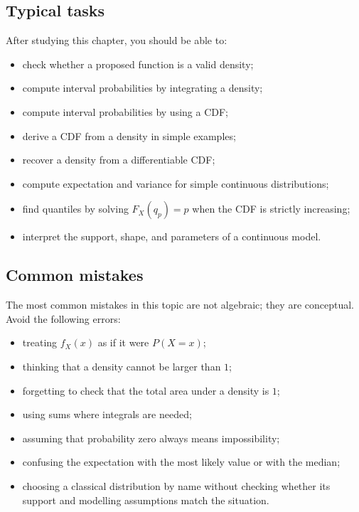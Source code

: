 \subsection*{Typical tasks}

After studying this chapter, you should be able to:
\begin{itemize}
    \item check whether a proposed function is a valid density;
    \item compute interval probabilities by integrating a density;
    \item compute interval probabilities by using a CDF;
    \item derive a CDF from a density in simple examples;
    \item recover a density from a differentiable CDF;
    \item compute expectation and variance for simple continuous distributions;
    \item find quantiles by solving \(F_X(q_p)=p\) when the CDF is strictly
    increasing;
    \item interpret the support, shape, and parameters of a continuous model.
\end{itemize}

\subsection*{Common mistakes}

The most common mistakes in this topic are not algebraic; they are conceptual.
Avoid the following errors:
\begin{itemize}
    \item treating \(f_X(x)\) as if it were \(P(X=x)\);
    \item thinking that a density cannot be larger than \(1\);
    \item forgetting to check that the total area under a density is \(1\);
    \item using sums where integrals are needed;
    \item assuming that probability zero always means impossibility;
    \item confusing the expectation with the most likely value or with the
    median;
    \item choosing a classical distribution by name without checking whether its
    support and modelling assumptions match the situation.
\end{itemize}

